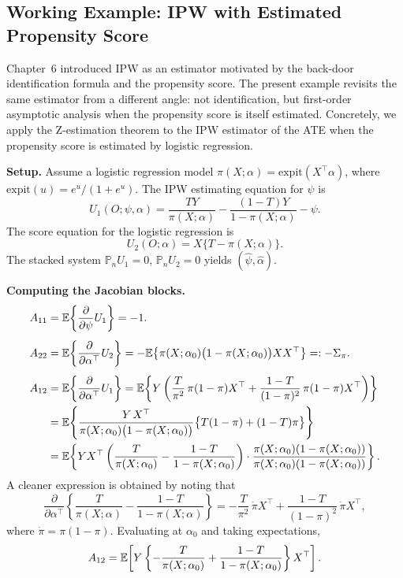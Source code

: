 \documentclass[master.tex]{subfiles}
\begin{document}
\subsection{Working Example: IPW with Estimated Propensity Score}
\label{w9:subsec:ipw-example}

Chapter~6 introduced IPW as an estimator motivated by the back-door
identification formula and the propensity score.  The present example
revisits the same estimator from a different angle: not identification,
but first-order asymptotic analysis when the propensity score is itself
estimated.  Concretely, we apply the Z-estimation theorem to the IPW
estimator of the ATE when the propensity score is estimated by logistic
regression.

\medskip\noindent\textbf{Setup.}
Assume a logistic regression model $\pi(X;\alpha) =
\mathrm{expit}(X^\top\alpha)$, where
$\mathrm{expit}(u) = e^u/(1+e^u)$.
The IPW estimating equation for $\psi$ is
\[
  U_1(O;\psi,\alpha)
  =
  \frac{TY}{\pi(X;\alpha)}
  - \frac{(1-T)Y}{1-\pi(X;\alpha)}
  - \psi.
\]
The score equation for the logistic regression is
\[
  U_2(O;\alpha)
  =
  X\bigl\{T - \pi(X;\alpha)\bigr\}.
\]
The stacked system $\mathbb{P}_n U_1 = 0$, $\mathbb{P}_n U_2 = 0$
yields $(\hat\psi, \hat\alpha)$.

\medskip\noindent\textbf{Computing the Jacobian blocks.}
\begin{align*}
  A_{11}
  &= \mathbb{E}\!\left\{\frac{\partial}{\partial\psi}U_1\right\} = -1.\\[4pt]
  A_{22}
  &= \mathbb{E}\!\left\{\frac{\partial}{\partial\alpha^\top}U_2\right\}
   = -\mathbb{E}\!\left\{\pi(X;\alpha_0)\bigl(1-\pi(X;\alpha_0)\bigr)
                 XX^\top\right\}
   =: -\Sigma_\pi.\\[4pt]
  A_{12}
  &= \mathbb{E}\!\left\{\frac{\partial}{\partial\alpha^\top}U_1\right\}
   = \mathbb{E}\!\left\{Y\left(
       \frac{T}{\pi^2}\,\pi(1-\pi)X^\top
      +\frac{1-T}{(1-\pi)^2}\,\pi(1-\pi)X^\top
     \right)\right\}\\
  &= \mathbb{E}\!\left\{\frac{Y\,X^\top}{\pi(X;\alpha_0)
       \bigl(1-\pi(X;\alpha_0)\bigr)}
     \bigl\{T(1-\pi) + (1-T)\pi\bigr\}\right\}\\
  &= \mathbb{E}\!\left\{Y X^\top
     \left(\frac{T}{\pi(X;\alpha_0)}
           - \frac{1-T}{1-\pi(X;\alpha_0)}\right)
     \cdot\frac{\pi(X;\alpha_0)(1-\pi(X;\alpha_0))}
               {\pi(X;\alpha_0)(1-\pi(X;\alpha_0))}\right\}.
\end{align*}
A cleaner expression is obtained by noting that
\[
  \frac{\partial}{\partial\alpha^\top}
  \left\{\frac{T}{\pi(X;\alpha)}-\frac{1-T}{1-\pi(X;\alpha)}\right\}
  =
  -\frac{T}{\pi^2}\,\dot\pi X^\top
  +\frac{1-T}{(1-\pi)^2}\,\dot\pi X^\top,
\]
where $\dot\pi = \pi(1-\pi)$.  Evaluating at $\alpha_0$ and taking
expectations,
\[
  A_{12}
  =
  \mathbb{E}\!\left[Y\left\{
    -\frac{T}{\pi(X;\alpha_0)}
    +\frac{1-T}{1-\pi(X;\alpha_0)}
  \right\}X^\top\right].
\]
\end{document}
